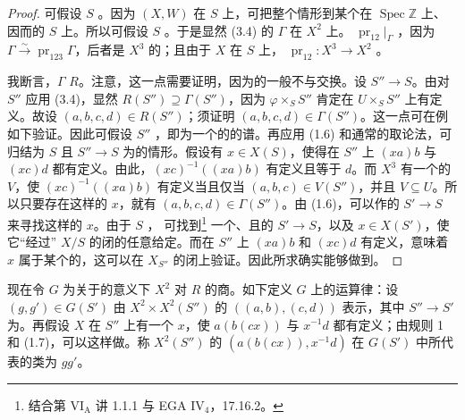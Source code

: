 \begin{proof}
可假设 $S$ 。因为 $(X,W)$ 在 $S$ 上，可把整个情形到某个在 $\operatorname{Spec}\mathbb Z$ 上、因而的 $S$ 上。所以可假设 $S$ 。于是显然 (3.4) 的 $\Gamma$ 在 $X^2$ 上。 $\operatorname{pr}_{12}|_\Gamma$ ，因为 $\Gamma\xrightarrow{\sim}\operatorname{pr}_{123}\Gamma$，后者是 $X^3$ 的；且由于 $X$ 在 $S$ 上， $\operatorname{pr}_{12}:X^3\to X^2$ 。

我断言，$\Gamma$  $R$。注意，这一点需要证明，因为的一般不与交换。设 $S''\to S$。由对 $S''$ 应用 (3.4)，显然 $R(S'')\supseteq\Gamma(S'')$，因为 $\varphi\times_S S''$ 肯定在 $U\times_S S''$ 上有定义。故设 $(a,b,c,d)\in R(S'')$；须证明 $(a,b,c,d)\in\Gamma(S'')$。这一点可在例如下验证。因此可假设 $S''$ ，即为一个的的谱。再应用 (1.6) 和通常的取论法，可归结为 $S$ 且 $S''\to S$ 为的情形。假设有 $x\in X(S)$，使得在 $S''$ 上 $(xa)b$ 与 $(xc)d$ 都有定义。由此，$(xc)^{-1}((xa)b)$ 有定义且等于 $d$。而 $X^3$ 有一个的 $V$，使 $(xc)^{-1}((xa)b)$ 有定义当且仅当 $(a,b,c)\in V(S'')$，并且 $V\subseteq U$。所以只要存在这样的 $x$，就有 $(a,b,c,d)\in\Gamma(S'')$。由 (1.6)，可以作的 $S'\to S$ 来寻找这样的 $x$。由于 $S$ ，
可找到\footnote{结合第 VI$_{\mathrm A}$ 讲 1.1.1 与 EGA IV$_4$，17.16.2。} 一个、且的 $S'\to S$，以及 $x\in X(S')$，使它“经过” $X/S$ 的闭的任意给定。而在 $S''$ 上 $(xa)b$ 和 $(xc)d$ 有定义，意味着 $x$ 属于某个的，这可以在 $X_{S''}$ 的闭上验证。因此所求确实能够做到。
\end{proof}
现在令 $G$ 为关于的意义下 $X^2$ 对 $R$ 的商。如下定义 $G$ 上的运算律：设 $(g,g')\in G(S')$ 由 $X^2\times X^2(S'')$ 的 $((a,b),(c,d))$ 表示，其中 $S''\to S'$ 为。再假设 $X$ 在 $S''$ 上有一个 $x$，使 $a(b(cx))$ 与 $x^{-1}d$ 都有定义；由规则 1 和 (1.7)，可以这样做。称 $X^2(S'')$ 的 $(a(b(cx)),x^{-1}d)$ 在 $G(S')$ 中所代表的类为 $gg'$。


